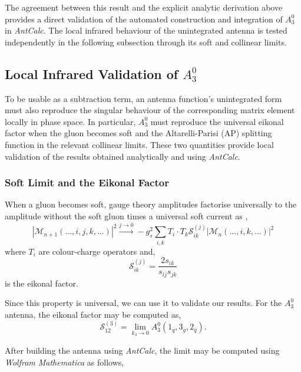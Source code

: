 The agreement between this result and the explicit analytic derivation above provides a direct
validation of the automated construction and integration of $A_3^0$ in \textit{AntCalc}. The local
infrared behaviour of the unintegrated antenna is tested independently in the following subsection
through its soft and collinear limits.


\subsection{Local Infrared Validation of $A_3^0$}\label{subsec:a30LocalValidation}

To be usable as a subtraction term, an antenna function's unintegrated form must also
reproduce the singular behaviour of the corresponding matrix element locally in phase 
space. In particular, $A_3^0$ must reproduce the universal eikonal factor when the gluon 
becomes soft and the Altarelli-Parisi (AP) splitting function in the relevant collinear limits. 
These two quantities provide local validation of the results obtained analytically
and using \textit{AntCalc}. 

\subsubsection*{Soft Limit and the Eikonal Factor}

When a gluon becomes soft, gauge theory amplitudes factorise universally to the
amplitude without the soft gluon times a universal soft current as \cite{Catani:1996vz},
\begin{equation}
    |\mathcal M_{n+1}(...,i,j,k,...)|^2\xrightarrow{j\to0}-g_s^2\sum_{i,k}T_i\cdot T_k \mathcal S_{ik}^{(j)}|\mathcal M_{n}(...,i,k,...)|^2
\end{equation}
where $T_i$ are colour-charge operators and,
\begin{equation}
    \mathcal S_{ik}^{(j)} = \frac{2s_{ik}}{s_{ij}s_{jk}}
\end{equation}
is the eikonal factor.

Since this property is universal, we can use it to validate our results. For the 
$A_3^0$ antenna, the eikonal factor may be computed as,
\begin{equation}
    \mathcal S_{12}^{(3)} = \lim_{k_3\to0}A_3^0(1_q, 3_g, 2_{\bar q}).
\end{equation}

After building the antenna using \textit{AntCalc}, the limit may be computed using 
\textit{Wolfram Mathematica} as follows,

